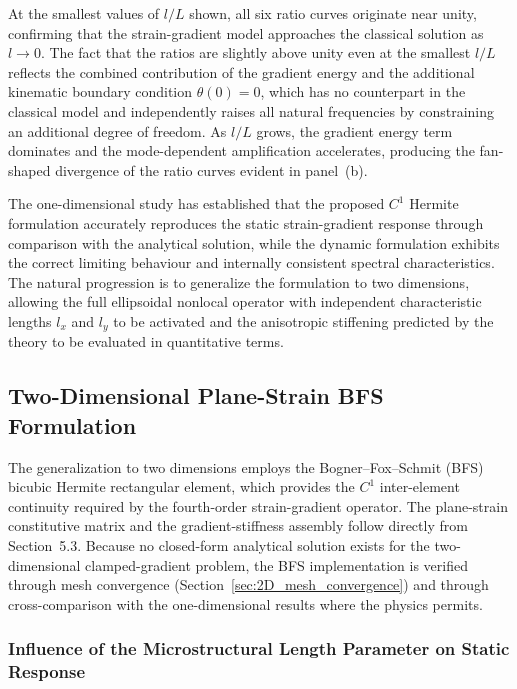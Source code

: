 \documentclass[final,3p,times,fleqn]{elsarticle}
\begin{document}
At the smallest values of $l/L$ shown, all six ratio curves originate
near unity, confirming that the strain-gradient model approaches the
classical solution as $l \to 0$.
The fact that the ratios are slightly above unity even at the smallest
$l/L$ reflects the combined contribution of the gradient energy and
the additional kinematic boundary condition $\theta(0) = 0$, which has
no counterpart in the classical model and independently raises all
natural frequencies by constraining an additional degree of freedom.
As $l/L$ grows, the gradient energy term dominates and the
mode-dependent amplification accelerates, producing the fan-shaped
divergence of the ratio curves evident in panel~(b).

The one-dimensional study has established that the proposed $C^{1}$ Hermite
formulation accurately reproduces the static strain-gradient response through
comparison with the analytical solution, while the dynamic formulation exhibits
the correct limiting behaviour and internally consistent spectral characteristics.
The natural progression is to generalize the formulation to two dimensions,
allowing the full ellipsoidal nonlocal operator with independent
characteristic lengths $l_{x}$ and $l_{y}$ to be activated and the
anisotropic stiffening predicted by the theory to be evaluated in
quantitative terms.

\subsection{Two-Dimensional Plane-Strain BFS Formulation}
\label{sec:2D_BFS}

The generalization to two dimensions employs the Bogner--Fox--Schmit (BFS)
bicubic Hermite rectangular element, which provides the $C^{1}$
inter-element continuity required by the fourth-order strain-gradient
operator.
The plane-strain constitutive matrix and the gradient-stiffness
assembly follow directly from Section~5.3.
Because no closed-form analytical solution exists for the
two-dimensional clamped-gradient problem, the BFS implementation is
verified through mesh convergence (Section~\ref{sec:2D_mesh_convergence})
and through cross-comparison with the one-dimensional results where
the physics permits.


\subsubsection{Influence of the Microstructural Length Parameter on
        Static Response}
\label{sec:2D_micro_length_effect}
\end{document}
